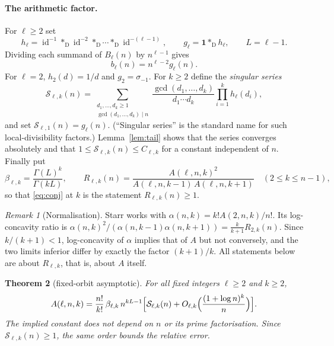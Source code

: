 \documentclass[11pt,a4paper]{article}
\newtheorem{theorem}{Theorem}[section]
\theoremstyle{remark}
\newtheorem{remark}[theorem]{Remark}
\numberwithin{equation}{section}
\newcommand{\Sing}{\mathcal S}
\newcommand{\id}{\operatorname{id}}
\newcommand{\Dc}{*_{\mathrm D}}
\newcommand{\one}{\mathbf 1}
\begin{document}
\paragraph{The arithmetic factor.} For $\ell\ge2$ set
\begin{equation}\label{eq:h}
h_\ell=\id^{-1}\Dc\id^{-2}\Dc\cdots\Dc\id^{-(\ell-1)},\qquad g_\ell=\one\Dc h_\ell,\qquad L=\ell-1 .
\end{equation}
Dividing each summand of $B_\ell(n)$ by $n^{\ell-1}$ gives
\begin{equation}\label{eq:b}
b_\ell(n)=n^{\ell-2}g_\ell(n).
\end{equation}
For $\ell=2$, $h_2(d)=1/d$ and $g_2=\sigma_{-1}$. For $k\ge2$ define the \emph{singular series}
\begin{equation}\label{eq:sing}
\Sing_{\ell,k}(n)=\sum_{\substack{d_1,\ldots,d_k\ge1\\ \gcd(d_1,\ldots,d_k)\mid n}}\frac{\gcd(d_1,\ldots,d_k)}{d_1\cdots d_k}\prod_{i=1}^k h_\ell(d_i),
\end{equation}
and set $\Sing_{\ell,1}(n)=g_\ell(n)$. (``Singular series'' is the standard name for such local-divisibility factors.) Lemma~\ref{lem:tail} shows that the series converges absolutely and that $1\le\Sing_{\ell,k}(n)\le C_{\ell,k}$ for a constant independent of $n$. Finally put
\begin{equation}\label{eq:beta}
\beta_{\ell,k}=\frac{\Gamma(L)^k}{\Gamma(kL)},\qquad
R_{\ell,k}(n)=\frac{A(\ell,n,k)^2}{A(\ell,n,k-1)\,A(\ell,n,k+1)}\quad(2\le k\le n-1),
\end{equation}
so that \eqref{eq:conj} at $k$ is the statement $R_{\ell,k}(n)\ge1$.

\begin{remark}[Normalisation]\label{rem:norm}
Starr \cite{Starr2026a} works with $\alpha(n,k)=k!A(2,n,k)/n!$. Its log-concavity ratio is $\alpha(n,k)^2/(\alpha(n,k-1)\alpha(n,k+1))=\frac{k}{k+1}R_{2,k}(n)$. Since $k/(k+1)<1$, log-concavity of $\alpha$ implies that of $A$ but not conversely, and the two limits inferior differ by exactly the factor $(k+1)/k$. All statements below are about $R_{\ell,k}$, that is, about $A$ itself.
\end{remark}

\begin{theorem}[fixed-orbit asymptotic]\label{thm:asym}
For all fixed integers $\ell\ge2$ and $k\ge2$,
\begin{equation}\label{eq:asym}
A(\ell,n,k)=\frac{n!}{k!}\,\beta_{\ell,k}\,n^{kL-1}\Bigl[\Sing_{\ell,k}(n)+O_{\ell,k}\Bigl(\frac{(1+\log n)^k}{n}\Bigr)\Bigr].
\end{equation}
The implied constant does not depend on $n$ or its prime factorisation. Since $\Sing_{\ell,k}(n)\ge1$, the same order bounds the relative error.
\end{theorem}
\end{document}
